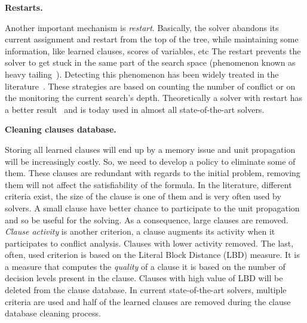 \textbf{Restarts.}

Another important mechanism is \emph{restart}. Basically, the solver abandons its current assignment and 
restart from the top of the tree, while maintaining some information, like learned clauses, scores of variables, etc The restart prevents the solver to get stuck in the same part of the search space (phenomenon known as heavy tailing~\cite{gomes1997heavy}).
Detecting this phenomenon has been widely treated in the literature~\cite{audemard2012refining,biere2008adaptive}.
These strategies are based on counting the number of conflict or on the monitoring the current search's depth.
Theoretically a solver with restart has a better result~\cite{huang2007effect} and is today
used in almost all state-of-the-art solvers.

\textbf{Cleaning clauses database.}

Storing  all learned clauses will end up by a memory issue and unit propagation will be increasingly costly.
 So, we need to develop a policy to eliminate some of them. These clauses are redundant with regards to the initial 
 problem, removing them will not affect the satisfiability of the formula.
  In the literature, different criteria exist,
 the size of the clause is one of them and is very often used by solvers. 
 A small clause have better chance to participate to the unit propagation and so be useful for the solving.
 As a consequence, large clauses are removed.
\emph{Clause activity} is another criterion, a clause augments its activity when it participates to conflict analysis. 
Clauses with lower activity removed.
 The last, often, used criterion is based on the Literal Block Distance (LBD) measure. It is a measure that computes the \emph{quality} of a clause it is based on the number of decision levels present in the clause. Clauses with high value of LBD will be deleted from the clause database.
In current state-of-the-art solvers, multiple criteria are used and half of the learned clauses are removed during the clause database cleaning process.
